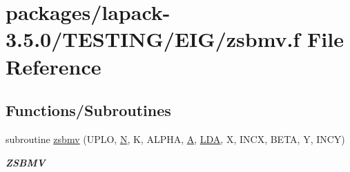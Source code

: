 \hypertarget{EIG_2zsbmv_8f}{}\section{packages/lapack-\/3.5.0/\+T\+E\+S\+T\+I\+N\+G/\+E\+I\+G/zsbmv.f File Reference}
\label{EIG_2zsbmv_8f}
\subsection*{Functions/\+Subroutines}
\begin{DoxyCompactItemize}
\item 
subroutine \hyperlink{group__complex16__eig_ga63eabd833fa379aa63dafb0a57392fe4}{zsbmv} (U\+P\+L\+O, \hyperlink{polmisc_8c_a0240ac851181b84ac374872dc5434ee4}{N}, K, A\+L\+P\+H\+A, \hyperlink{classA}{A}, \hyperlink{example__user_8c_ae946da542ce0db94dced19b2ecefd1aa}{L\+D\+A}, X, I\+N\+C\+X, B\+E\+T\+A, Y, I\+N\+C\+Y)
\begin{DoxyCompactList}\small\item\em {\bfseries Z\+S\+B\+M\+V} \end{DoxyCompactList}\end{DoxyCompactItemize}
